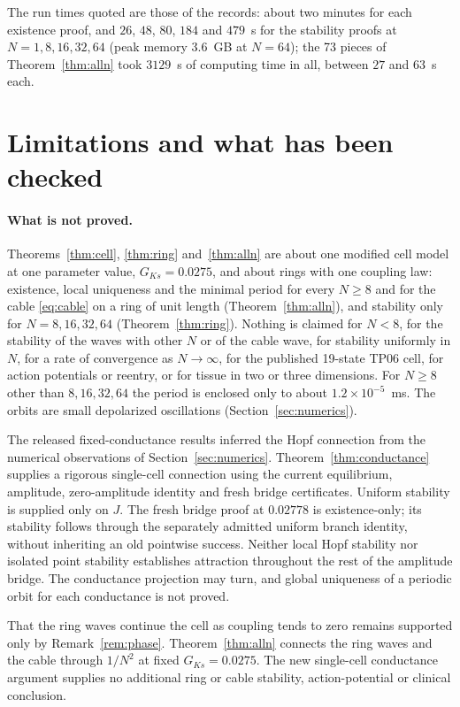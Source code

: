 \documentclass[11pt]{article}
\theoremstyle{definition}
\begin{document}
The run times quoted are those of the records: about two minutes for each existence proof, and $26$, $48$, $80$, $184$ and $479$~s for the stability proofs at $N = 1, 8, 16, 32, 64$ (peak memory $3.6$~GB at $N = 64$); the 73 pieces of Theorem~\ref{thm:alln} took $3129$~s of computing time in all, between $27$ and $63$~s each.

\section{Limitations and what has been checked}\label{sec:limits}

\paragraph{What is not proved.} Theorems~\ref{thm:cell}, \ref{thm:ring} and~\ref{thm:alln} are about one modified cell model at one parameter value, $G_{Ks} = 0.0275$, and about rings with one coupling law: existence, local uniqueness and the minimal period for every $N \ge 8$ and for the cable \eqref{eq:cable} on a ring of unit length (Theorem~\ref{thm:alln}), and stability only for $N = 8, 16, 32, 64$ (Theorem~\ref{thm:ring}). Nothing is claimed for $N < 8$, for the stability of the waves with other $N$ or of the cable wave, for stability uniformly in $N$, for a rate of convergence as $N \to \infty$, for the published 19-state TP06 cell, for action potentials or reentry, or for tissue in two or three dimensions. For $N \ge 8$ other than $8, 16, 32, 64$ the period is enclosed only to about $1.2 \times 10^{-5}$~ms. The orbits are small depolarized oscillations (Section~\ref{sec:numerics}).

The released fixed-conductance results inferred the Hopf connection from the numerical observations of Section~\ref{sec:numerics}. Theorem~\ref{thm:conductance} supplies a rigorous single-cell connection using the current equilibrium, amplitude, zero-amplitude identity and fresh bridge certificates. Uniform stability is supplied only on $J$. The fresh bridge proof at $0.02778$ is existence-only; its stability follows through the separately admitted uniform branch identity, without inheriting an old pointwise success. Neither local Hopf stability nor isolated point stability establishes attraction throughout the rest of the amplitude bridge. The conductance projection may turn, and global uniqueness of a periodic orbit for each conductance is not proved.

That the ring waves continue the cell as coupling tends to zero remains supported only by Remark~\ref{rem:phase}. Theorem~\ref{thm:alln} connects the ring waves and the cable through $1/N^2$ at fixed $G_{Ks}=0.0275$. The new single-cell conductance argument supplies no additional ring or cable stability, action-potential or clinical conclusion.
\end{document}
